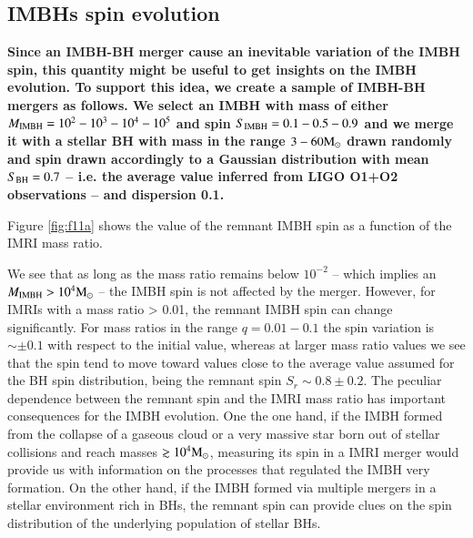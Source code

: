 \documentclass[article]{aa}
\newcommand{\Ms}{{\rm M}_\odot}
\newcommand{\ibh}{{\rm IMBH}}
\newcommand{\bh}{{\rm BH}}
\begin{document}
\subsection{IMBHs spin evolution}
{\bf 
Since an IMBH-BH merger cause an inevitable variation of the IMBH spin, this quantity might be useful to get insights on the IMBH evolution.
To support this idea, we create a sample of IMBH-BH mergers as follows. We select an IMBH with mass of either $M_\ibh = 10^2 - 10^3 - 10^4 - 10^5$ and spin $S_\ibh = 0.1 - 0.5 - 0.9$ and we merge it with a stellar BH with mass in the range $3 - 60 \Ms$ drawn randomly and spin drawn accordingly to a Gaussian distribution with mean $S_\bh = 0.7$ -- i.e. the average value inferred from LIGO O1+O2 observations -- and dispersion 0.1.

Figure \ref{fig:f11a} shows the value of the remnant IMBH spin as a function of the IMRI mass ratio. 

We see that as long as the mass ratio remains below $10^{-2}$ -- which implies an $M_\ibh > 10^4 \Ms$ -- the IMBH spin is not affected by the merger. However, for IMRIs with a mass ratio > 0.01, the remnant IMBH spin can change significantly. For mass ratios in the range $q = 0.01-0.1$ the spin variation is $\sim \pm 0.1$ with respect to the initial value, whereas at larger mass ratio values we see that the spin tend to move toward values close to the average value assumed for the BH spin distribution, being the remnant spin $S_r \sim 0.8\pm 0.2$.
The peculiar dependence between the remnant spin and the IMRI mass ratio has important consequences for the IMBH evolution. One the one hand, if the IMBH formed from the collapse of a gaseous cloud or a very massive star born out of stellar collisions and reach masses $\gtrsim 10^4\Ms$, measuring its spin in a IMRI merger would provide us with information on the processes that regulated the IMBH very formation. On the other hand,
if the IMBH formed via multiple mergers in a stellar environment rich in BHs, the remnant spin can provide clues on the spin distribution of the underlying population of stellar BHs.

}
\end{document}
